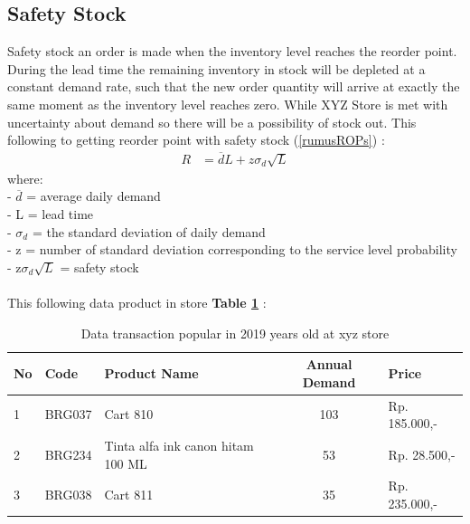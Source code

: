 \documentclass[12pt,a4paper,final]{iopart}
\begin{document}
\subsection{Safety Stock}
Safety stock an order is made when the inventory level reaches the reorder point. During the lead time the remaining inventory in stock will be depleted at a constant demand rate, such that the new order quantity will arrive at exactly the same moment as the inventory level reaches zero. While XYZ Store is met with uncertainty about demand so there will be a possibility of stock out. This following to getting reorder point with safety stock (\ref{rumusROPs}) \cite{Rusell2011}:
\begin{eqnarray}
	\label{rumusROPs}
	R &= \overline{d}L + z\sigma_d\sqrt{L}
\end{eqnarray}
where:\\
- $\overline{d}$ = average daily demand\\
- L = lead time\\
- $\sigma_d$ = the standard deviation of daily demand\\
- z = number of standard deviation corresponding to the service level probability\\
- z$\sigma_d\sqrt{L}$ = safety stock\\ \\
This following data product in store \textbf{Table \ref{tableBarang}} :
\begin{table}[h!]
	\centering
	\caption{\label{tableBarang} Data transaction popular in 2019 years old at xyz store}
	\begin{tabular}{ lllcl }
		\hline
		\textbf{No} & \textbf{Code} & \textbf{Product Name} & \textbf{Annual Demand} & \textbf{Price} \\
		\hline
		1 & BRG037 & Cart 810 & 103 & Rp. 185.000,-  \\ 
		2 & BRG234 & Tinta alfa ink canon hitam 100 ML & 53 &  Rp. 28.500,-  \\ 
		3 & BRG038 & Cart 811 & 35 & Rp. 235.000,- \\ 
		\hline
	\end{tabular}
\end{table}
\end{document}
